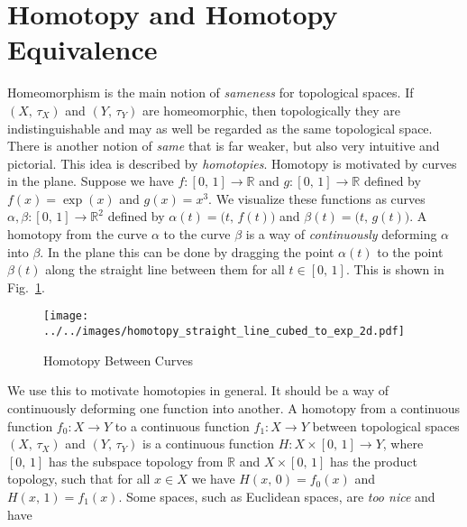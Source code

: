 \documentclass{article}
\theoremstyle{plain}
\theoremstyle{normal}
\newenvironment{definition}{%
    \pushQED{\qed}\renewcommand{\qedsymbol}{$\blacksquare$}\definitionx%
}{%
    \popQED\enddefinitionx%
}
\begin{document}
    \section{Homotopy and Homotopy Equivalence}
        Homeomorphism is the main notion of \textit{sameness} for topological
        spaces. If $(X,\,\tau_{X})$ and $(Y,\,\tau_{Y})$ are homeomorphic,
        then topologically they are indistinguishable and may as well be
        regarded as the same topological space. There is another notion of
        \textit{same} that is far weaker, but also very intuitive and
        pictorial. This idea is described by \textit{homotopies}. Homotopy
        is motivated by curves in the plane. Suppose we have
        $f:[0,\,1]\rightarrow\mathbb{R}$ and $g:[0,\,1]\rightarrow\mathbb{R}$
        defined by $f(x)=\exp(x)$ and $g(x)=x^{3}$. We visualize these functions
        as curves $\alpha,\beta:[0,\,1]\rightarrow\mathbb{R}^{2}$ defined by
        $\alpha(t)=\big(t,\,f(t)\big)$ and $\beta(t)=\big(t,\,g(t)\big)$. A
        homotopy from the curve $\alpha$ to the curve $\beta$ is a way of
        \textit{continuously} deforming $\alpha$ into $\beta$. In the plane this
        can be done by dragging the point $\alpha(t)$ to the point $\beta(t)$
        along the straight line between them for all $t\in[0,\,1]$. This is
        shown in Fig.~\ref{fig:homotopy_straight_line_cubed_to_exp_2d}.
        \begin{figure}
            \centering
            \texttt{[image: ../../images/homotopy\_straight\_line\_cubed\_to\_exp\_2d.pdf]}
            \caption{Homotopy Between Curves}
            \label{fig:homotopy_straight_line_cubed_to_exp_2d}
        \end{figure}
        We use this to motivate homotopies in general. It should be a way of
        continuously deforming one function into another.
        \begin{definition}[\textbf{Homotopy}]
            A homotopy from a continuous function $f_{0}:X\rightarrow{Y}$ to
            a continuous function $f_{1}:X\rightarrow{Y}$ between topological
            spaces $(X,\,\tau_{X})$ and $(Y,\,\tau_{Y})$ is a continuous
            function $H:X\times[0,\,1]\rightarrow{Y}$, where $[0,\,1]$ has the
            subspace topology from $\mathbb{R}$ and $X\times[0,\,1]$ has the
            product topology, such that for all $x\in{X}$ we have
            $H(x,\,0)=f_{0}(x)$ and $H(x,\,1)=f_{1}(x)$.
        \end{definition}
        Some spaces, such as Euclidean spaces, are \textit{too nice} and have
\end{document}
